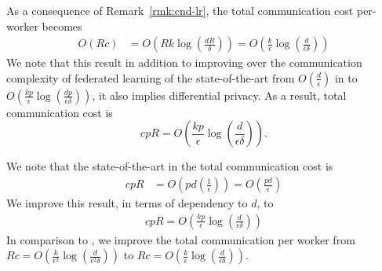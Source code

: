 \begin{corollary}
As a consequence of Remark~\ref{rmk:cnd-lr}, the total communication cost per-worker becomes \begin{align}
O\left(Rc\right)&=O\left(Rk\log \left(\frac{d R}{\delta}\right)\right)=O\left(\frac{k }{\epsilon}\log \left(\frac{d }{\epsilon\delta}\right)\right)
\end{align}
We note that this result in addition to improving over the communication complexity of federated learning of the state-of-the-art from $O\left(\frac{d}{\epsilon}\right)$ in \cite{karimireddy2019scaffold,wang2018cooperative,liang2019variance} to $O\left(\frac{k p}{\epsilon}\log \left(\frac{d p}{\epsilon\delta}\right)\right)$, it also implies differential privacy. As a result, total communication cost is 
$$cpR=O\left(\frac{k p}{\epsilon}\log \left(\frac{d }{\epsilon\delta}\right)\right).$$ 
\end{corollary}

\begin{remark}
We note that the state-of-the-art in \cite{karimireddy2019scaffold} the total communication cost is 
\begin{align}
    cpR&=O\left(pd\left(\frac{1}{\epsilon}\right) \right)=O\left(\frac{pd}{\epsilon}\right) 
\end{align}
We improve this result, in terms of dependency to $d$, to 
\begin{align}
    cpR=O\left(\frac{k p}{\epsilon}\log \left(\frac{d }{\epsilon\delta}\right)\right)
\end{align}
In comparison to \cite{ivkin2019communication}, we improve the total communication per worker from $Rc=O\left(\frac{k }{\epsilon^2}\log \left(\frac{d }{\epsilon^2\delta}\right)\right)$ to $Rc=O\left(\frac{k }{\epsilon}\log \left(\frac{d }{\epsilon\delta}\right)\right)$.

\end{remark}

